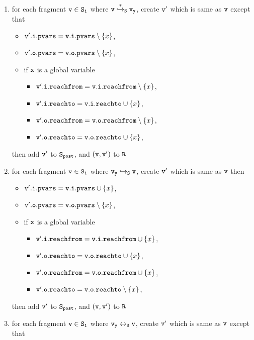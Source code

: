 \begin{itemize}
\begin{enumerate}
\item  for each fragment $\tt v \in S_1$ where $\tt v \overset{*}\hookrightarrow_S v_y$, create $\tt v'$ which is same as $\tt v$ except that
\begin{itemize}
\item $\mathtt{v}'.\mathtt{i}.\mathtt{pvars} = \mathtt{v}.\mathtt{i}.\mathtt{pvars} \setminus \left\{x\right\}$,
\item $\mathtt{v}'.\mathtt{o}.\mathtt{pvars} = \mathtt{v}.\mathtt{o}.\mathtt{pvars} \setminus \left\{x\right\}$,
\item if $\tt x$ is a global variable
\begin{itemize}
\item $\mathtt{v}'.\mathtt{i}.\mathtt{reachfrom} = \mathtt{v}.\mathtt{i}.\mathtt{reachfrom} \setminus \left\{x\right\}$,
\item $\mathtt{v}'.\mathtt{i}.\mathtt{reachto} = \mathtt{v}.\mathtt{i}.\mathtt{reachto} \cup \left\{x\right\}$,
\item $\mathtt{v}'.\mathtt{o}.\mathtt{reachfrom} = \mathtt{v}.\mathtt{o}.\mathtt{reachfrom} \setminus \left\{x\right\}$,
\item $\mathtt{v}'.\mathtt{o}.\mathtt{reachto} = \mathtt{v}.\mathtt{o}.\mathtt{reachto} \cup \left\{x\right\}$,
\end{itemize}
\end{itemize}
then add $\tt v'$ to $\tt S_{post}$, and $\tt (v,v')$ to $\tt R$
\item for each fragment $\tt v \in S_1$ where $\tt v_y \hookrightarrow_S v$, create $\tt v'$ which is same as $\tt v$ then
\begin{itemize}
\item $\mathtt{v}'.\mathtt{i}.\mathtt{pvars} = \mathtt{v}.\mathtt{i}.\mathtt{pvars} \cup \left\{x\right\}$,
\item $\mathtt{v}'.\mathtt{o}.\mathtt{pvars} = \mathtt{v}.\mathtt{o}.\mathtt{pvars} \setminus \left\{x\right\}$,
\item if $\tt x$ is a global variable
\begin{itemize}
\item $\mathtt{v}'.\mathtt{i}.\mathtt{reachfrom} = \mathtt{v}.\mathtt{i}.\mathtt{reachfrom} \cup \left\{x\right\}$,
 \item $\mathtt{v}'.\mathtt{o}.\mathtt{reachto} = \mathtt{v}.\mathtt{o}.\mathtt{reachto} \cup \left\{x\right\}$,
 \item $\mathtt{v}'.\mathtt{o}.\mathtt{reachfrom} = \mathtt{v}.\mathtt{o}.\mathtt{reachfrom} \cup \left\{x\right\}$,
 \item $\mathtt{v}'.\mathtt{o}.\mathtt{reachto} = \mathtt{v}.\mathtt{o}.\mathtt{reachto} \setminus \left\{x\right\}$,
\end{itemize}
\end{itemize}
then add $\tt v'$ to $\tt S_{post}$, and $\tt (v,v')$ to $\tt R$
\item for each fragment $\tt v \in S_1$ where $\tt v_y \leftrightarrow_S v$, create $\tt v'$ which is same as $\tt v$ except that

\end{enumerate}
\end{itemize}
